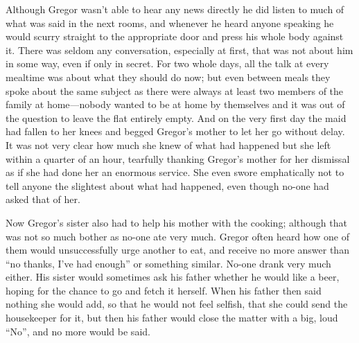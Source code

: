 Although Gregor wasn’t able to hear any news directly he did listen to
much of what was said in the next rooms, and whenever he heard anyone
speaking he would scurry straight to the appropriate door and press his
whole body against it. There was seldom any conversation, especially at
first, that was not about him in some way, even if only in secret. For
two whole days, all the talk at every mealtime was about what they
should do now; but even between meals they spoke about the same subject
as there were always at least two members of the family at home—nobody
wanted to be at home by themselves and it was out of the question to
leave the flat entirely empty. And on the very first day the maid had
fallen to her knees and begged Gregor’s mother to let her go without
delay. It was not very clear how much she knew of what had happened but
she left within a quarter of an hour, tearfully thanking Gregor’s
mother for her dismissal as if she had done her an enormous service.
She even swore emphatically not to tell anyone the slightest about what
had happened, even though no-one had asked that of her.

Now Gregor’s sister also had to help his mother with the cooking;
although that was not so much bother as no-one ate very much. Gregor
often heard how one of them would unsuccessfully urge another to eat,
and receive no more answer than “no thanks, I’ve had enough” or
something similar. No-one drank very much either. His sister would
sometimes ask his father whether he would like a beer, hoping for the
chance to go and fetch it herself. When his father then said nothing
she would add, so that he would not feel selfish, that she could send
the housekeeper for it, but then his father would close the matter with
a big, loud “No”, and no more would be said.

